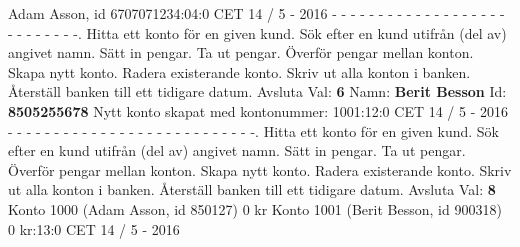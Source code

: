 \begin{multicols}{2}
Adam Asson, id 6707071234:04:0 CET 14 / 5 - 2016\newline
- - - - - - - - - - - - - - - - - - - - - - - - - - -.   Hitta ett konto för en given kund.   Sök efter en kund utifrån (del av) angivet namn.   Sätt in pengar.   Ta ut pengar.   Överför pengar mellan konton.   Skapa nytt konto.   Radera existerande konto.   Skriv ut alla konton i banken.   Återställ banken till ett tidigare datum. Avsluta\newline
Val: \textbf{6}\newline
Namn: \textbf{Berit Besson}\newline
Id: \textbf{8505255678}\newline
Nytt konto skapat med kontonummer: 1001:12:0 CET 14 / 5 - 2016\newline 
- - - - - - - - - - - - - - - - - - - - - - - - - - -.   Hitta ett konto för en given kund.   Sök efter en kund utifrån (del av) angivet namn.   Sätt in pengar.   Ta ut pengar.   Överför pengar mellan konton.   Skapa nytt konto.   Radera existerande konto.   Skriv ut alla konton i banken.   Återställ banken till ett tidigare datum. Avsluta\newline
Val: \textbf{8}\newline
Konto 1000 (Adam Asson, id 850127) 0 kr\newline
Konto 1001 (Berit Besson, id 900318) 0 kr:13:0 CET 14 / 5 - 2016\newline

\end{multicols}
